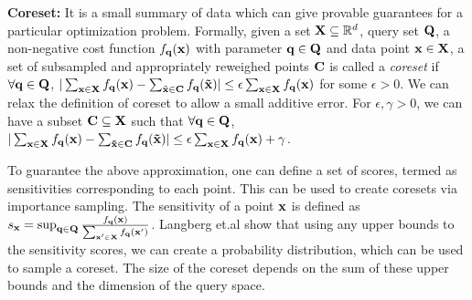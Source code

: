 \textbf{Coreset:}
It is a small summary of data which can give provable guarantees for a particular optimization problem. Formally, given a set
$\mathbf{X} \subseteq \mathbb{R}^d$, query set $\mathbf{Q}$, a non-negative cost function $\mathnormal{f}_{\mathbf{q}}(\mathbf{x})$ with parameter $\mathbf{q} \in \mathbf{Q}$ and data point $\mathbf{x} \in \mathbf{X}$, a set of subsampled and appropriately reweighed points $\mathbf{C}$ is called a {\em coreset} if $\forall \mathbf{q} \in \mathbf{Q}$,  $|\sum_{\mathbf{x} \in \mathbf{X}}\mathnormal{f}_{\mathbf{q}}(\mathbf{x}) - \sum_{\tilde{\mathbf{x}} \in \mathbf{C}}\mathnormal{f}_{\mathbf{q}}(\mathbf{\tilde{x}})| \leq \epsilon\sum_{\mathbf{x} \in \mathbf{X}}\mathnormal{f}_{\mathbf{q}}(\mathbf{x})$ for some $\epsilon > 0$.
We can relax the definition of coreset to allow a small additive error. For $\epsilon, \gamma > 0$, we can have a subset $\mathbf{C}\subseteq \mathbf{X}$ such that $\forall \mathbf{q} \in \mathbf{Q}$, $|\sum_{\mathbf{x} \in \mathbf{X}}\mathnormal{f}_{\mathbf{q}}(\mathbf{x}) - \sum_{\mathbf{\tilde{x}} \in \mathbf{C}}\mathnormal{f}_{\mathbf{q}}(\mathbf{\tilde{x}})| \leq \epsilon\sum_{\mathbf{x} \in \mathbf{X}}\mathnormal{f}_{\mathbf{q}}(\mathbf{x}) + \gamma$. 

To guarantee the above approximation, one can define a set of scores, termed as sensitivities \cite{langberg2010universal} corresponding to each point. This can be used to create coresets via importance sampling. The sensitivity of a point $ \mathbf{x} $ is defined as $s_{\mathbf{x}} = \sup_{\mathbf{q} \in \mathbf{Q}} \frac{ \mathnormal{f}_{\mathbf{q}}(\mathbf{x})}{\sum_{\mathbf{x}' \in \mathbf{X}} \mathnormal{f}_{\mathbf{q}}(\mathbf{x}')}$. Langberg et.al \cite{langberg2010universal} show that using any upper bounds to the sensitivity scores, we can create a probability distribution, which can be used to sample a coreset. The size of the coreset depends on the sum of these upper bounds and the dimension of the query space.

